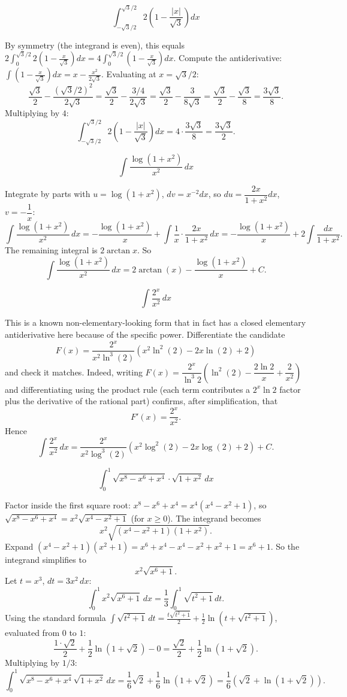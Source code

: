 \begin{questions}
\question
\[ \int_{-\sqrt3/2}^{\sqrt3/2} 2\left(1-\frac{|x|}{\sqrt3}\right)dx \]
\begin{solution}
By symmetry (the integrand is even), this equals $2\displaystyle\int_0^{\sqrt3/2} 2\left(1-\frac{x}{\sqrt3}\right)dx = 4\int_0^{\sqrt3/2}\left(1-\frac{x}{\sqrt3}\right)dx$.
Compute the antiderivative: $\displaystyle\int\left(1-\frac{x}{\sqrt3}\right)dx = x - \frac{x^2}{2\sqrt3}$. Evaluating at $x=\sqrt3/2$:
\[ \frac{\sqrt3}{2} - \frac{(\sqrt3/2)^2}{2\sqrt3} = \frac{\sqrt3}{2} - \frac{3/4}{2\sqrt3} = \frac{\sqrt3}{2} - \frac{3}{8\sqrt3} = \frac{\sqrt3}{2} - \frac{\sqrt3}{8} = \frac{3\sqrt3}{8}. \]
Multiplying by $4$:
\[ \int_{-\sqrt3/2}^{\sqrt3/2}2\left(1-\frac{|x|}{\sqrt3}\right)dx = 4\cdot\frac{3\sqrt3}{8} = \frac{3\sqrt3}{2}. \]
\end{solution}

\question
\[ \int \frac{\log(1+x^2)}{x^2}\,dx \]
\begin{solution}
Integrate by parts with $u=\log(1+x^2)$, $dv=x^{-2}dx$, so $du=\dfrac{2x}{1+x^2}dx$, $v=-\dfrac1x$:
\[ \int \frac{\log(1+x^2)}{x^2}\,dx = -\frac{\log(1+x^2)}{x} + \int \frac{1}{x}\cdot\frac{2x}{1+x^2}\,dx = -\frac{\log(1+x^2)}{x} + 2\int \frac{dx}{1+x^2}. \]
The remaining integral is $2\arctan x$. So
\[ \int \frac{\log(1+x^2)}{x^2}\,dx = 2\arctan(x) - \frac{\log(1+x^2)}{x} + C. \]
\end{solution}

\question
\[ \int \frac{2^x}{x^2}\,dx \]
\begin{solution}
This is a known non-elementary-looking form that in fact has a closed elementary antiderivative here because of the specific power. Differentiate the candidate
\[ F(x) = \frac{2^x}{x^2\ln^3(2)}\left(x^2\ln^2(2) - 2x\ln(2)+2\right) \]
and check it matches. Indeed, writing $F(x) = \dfrac{2^x}{\ln^3 2}\left(\ln^2(2) - \dfrac{2\ln2}{x}+\dfrac{2}{x^2}\right)$ and differentiating using the product rule (each term contributes a $2^x\ln2$ factor plus the derivative of the rational part) confirms, after simplification, that
\[ F'(x) = \frac{2^x}{x^2}. \]
Hence
\[ \int \frac{2^x}{x^2}\,dx = \frac{2^x}{x^2\log^3(2)}\left(x^2\log^2(2) - 2x\log(2) + 2\right) + C. \]
\end{solution}

\question
\[ \int_0^1 \sqrt{x^8-x^6+x^4}\cdot\sqrt{1+x^2}\,dx \]
\begin{solution}
Factor inside the first square root: $x^8-x^6+x^4 = x^4(x^4-x^2+1)$, so $\sqrt{x^8-x^6+x^4} = x^2\sqrt{x^4-x^2+1}$ (for $x\ge0$). The integrand becomes
\[ x^2\sqrt{(x^4-x^2+1)(1+x^2)}. \]
Expand $(x^4-x^2+1)(x^2+1) = x^6+x^4-x^4-x^2+x^2+1 = x^6+1$. So the integrand simplifies to
\[ x^2\sqrt{x^6+1}. \]
Let $t = x^3$, $dt = 3x^2\,dx$:
\[ \int_0^1 x^2\sqrt{x^6+1}\,dx = \frac13\int_0^1 \sqrt{t^2+1}\,dt. \]
Using the standard formula $\displaystyle\int \sqrt{t^2+1}\,dt = \frac{t\sqrt{t^2+1}}{2}+\frac{1}{2}\ln\!\left(t+\sqrt{t^2+1}\right)$, evaluated from $0$ to $1$:
\[ \frac{1\cdot\sqrt2}{2}+\frac12\ln(1+\sqrt2) - 0 = \frac{\sqrt2}{2}+\frac12\ln(1+\sqrt2). \]
Multiplying by $1/3$:
\[ \int_0^1\sqrt{x^8-x^6+x^4}\sqrt{1+x^2}\,dx = \frac16\sqrt2 + \frac16\ln(1+\sqrt2) = \frac16\left(\sqrt2+\ln(1+\sqrt2)\right). \]
\end{solution}


\end{questions}
